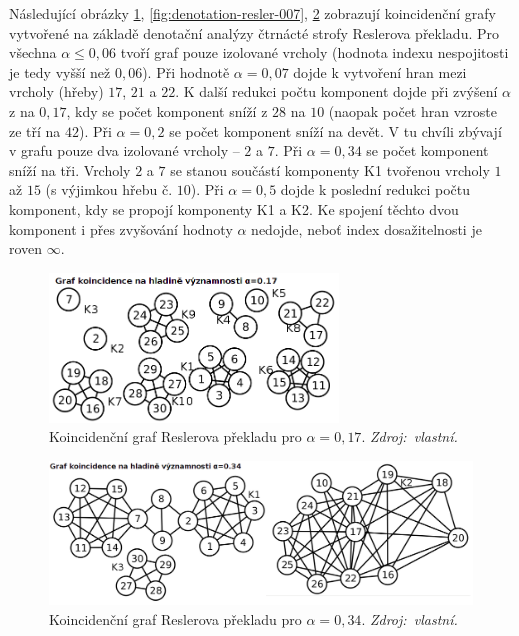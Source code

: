 \documentclass[dp.tex]{subfiles}
\begin{document}
Následující obrázky \ref{fig:denotation-resler-005}, \ref{fig:denotation-resler-007}, \ref{fig:denotation-resler-034}  zobrazují koincidenční grafy vytvořené na základě denotační analýzy čtrnácté strofy Reslerova překladu. Pro všechna $\alpha \leq 0{,}06$ tvoří graf pouze izolované vrcholy (hodnota indexu nespojitosti je tedy vyšší než $0{,}06$). Při hodnotě $\alpha = 0{,}07$ dojde k vytvoření hran mezi vrcholy (hřeby) $17$, $21$ a $22$. K další redukci počtu komponent dojde při zvýšení $\alpha$ z na $0{,}17$, kdy se počet komponent sníží z $28$ na $10$ (naopak počet hran vzroste ze tří na $42$). Při $\alpha = 0{,}2$ se počet komponent sníží na devět. V tu chvíli zbývají v grafu pouze dva izolované vrcholy -- $2$ a $7$. Při $\alpha = 0{,}34$ se počet komponent sníží na tři. Vrcholy $2$ a $7$ se stanou součástí komponenty K1 tvořenou vrcholy $1$ až $15$ (s výjimkou hřebu č. $10$). Při $\alpha = 0{,}5$ dojde k poslední redukci počtu komponent, kdy se propojí komponenty K1 a K2. Ke spojení těchto dvou komponent i přes zvyšování hodnoty $\alpha$ nedojde, neboť index dosažitelnosti je roven $\infty$.

\begin{figure}[H]
	\centering
	\includegraphics[max width=\textwidth,height=150px,keepaspectratio=true]{imgs-70-prakticka/denotation-resler-017}
	\caption[Koincidenční graf Reslerova překladu pro $\alpha = 0{,}17$.]{Koincidenční graf Reslerova překladu pro $\alpha = 0{,}17$. \textit{Zdroj:~vlastní.}}
	\label{fig:denotation-resler-005}
\end{figure}

\begin{figure}[H]
	\centering
	\includegraphics[max width=\textwidth,keepaspectratio=true]{imgs-70-prakticka/denotation-resler-034}
	\caption[Koincidenční graf Reslerova překladu pro $\alpha = 0{,}34$.]{Koincidenční graf Reslerova překladu pro $\alpha = 0{,}34$. \textit{Zdroj:~vlastní.}}
	\label{fig:denotation-resler-034}
\end{figure}
\end{document}
